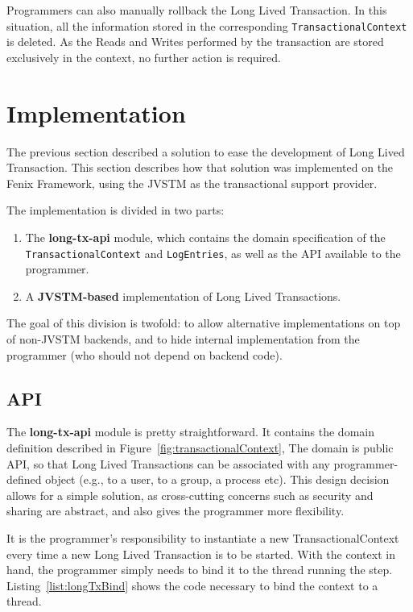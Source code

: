 Programmers can also manually rollback the Long Lived Transaction. In
this situation, all the information stored in the corresponding
\texttt{TransactionalContext} is deleted. As the Reads and Writes
performed by the transaction are stored exclusively in the context, no
further action is required.

\section{Implementation}
\label{sec:impl}


The previous section described a solution to ease the development of
Long Lived Transaction. This section describes how that solution was
implemented on the Fenix Framework, using the JVSTM as the
transactional support provider.

The implementation is divided in two parts:

\begin{enumerate}

\item The {\bf long-tx-api} module, which contains the domain
  specification of the \texttt{TransactionalContext} and
  \texttt{LogEntries}, as well as the API available to the programmer.

\item A {\bf JVSTM-based} implementation of Long Lived Transactions.
\end{enumerate}

The goal of this division is twofold: to allow alternative
implementations on top of non-JVSTM backends, and to hide internal
implementation from the programmer (who should not depend on backend
code).

\subsection{API}

The {\bf long-tx-api} module is pretty straightforward. It contains
the domain definition described in
Figure~\ref{fig:transactionalContext}, The domain is public API, so
that Long Lived Transactions can be associated with any
programmer-defined object (e.g., to a user, to a group, a process
etc). This design decision allows for a simple solution, as
cross-cutting concerns such as security and sharing are abstract, and
also gives the programmer more flexibility.

It is the programmer's responsibility to instantiate a new
TransactionalContext every time a new Long Lived Transaction is to be
started. With the context in hand, the programmer simply needs to bind
it to the thread running the step. Listing~\ref{list:longTxBind} shows
the code necessary to bind the context to a thread.

